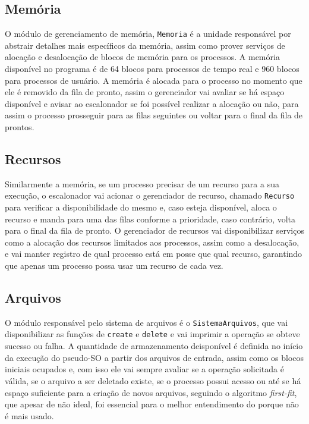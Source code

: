 \documentclass[12pt]{article}
\begin{document}
\subsection{Memória}
O módulo de gerenciamento de memória, \texttt{Memoria} é a unidade responsável por abstrair detalhes mais específicos da memória, assim como prover serviços de alocação e desalocação de blocos de memória para os processos. A memória disponível no programa é de 64 blocos para processos de tempo real e 960 blocos para processos de usuário. A memória é alocada para o processo no momento que ele é removido da fila de pronto, assim o gerenciador vai avaliar se há espaço disponível e avisar ao escalonador se foi possível realizar a alocação ou não, para assim o processo prosseguir para as filas seguintes ou voltar para o final da fila de prontos.

\subsection{Recursos}
Similarmente a memória, se um processo precisar de um recurso para a sua execução, o escalonador vai acionar o gerenciador de recurso, chamado \texttt{Recurso} para verificar a disponibilidade do mesmo e, caso esteja disponível, aloca o recurso e manda para uma das filas conforme a prioridade, caso contrário, volta para o final da fila de pronto. O gerenciador de recursos vai disponibilizar serviços como a alocação dos recursos limitados aos processos, assim como a desalocação, e vai manter registro de qual processo está em posse que qual recurso, garantindo que apenas um processo possa usar um recurso de cada vez.

\subsection{Arquivos}
O módulo responsável pelo sistema de arquivos é o \texttt{SistemaArquivos}, que vai disponibilizar as funções de \texttt{create} e \texttt{delete} e vai imprimir a operação se obteve sucesso ou falha. A quantidade de armazenamento deisponível é definida no início da execução do pseudo-SO a partir dos arquivos de entrada, assim como os blocos iniciais ocupados e, com isso ele vai sempre avaliar se a operação solicitada é válida, se o arquivo a ser deletado existe, se o processo possui acesso ou até se há espaço suficiente para a criação de novos arquivos, seguindo o algoritmo \textit{first-fit}, que apesar de não ideal, foi essencial para o melhor entendimento do porque não é mais usado.
\end{document}
